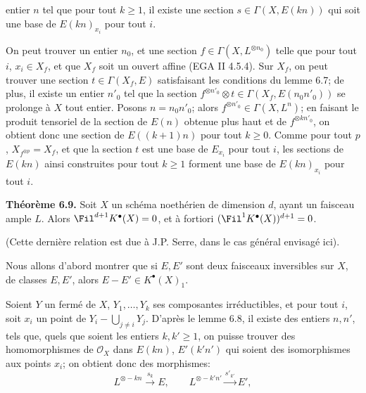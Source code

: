 entier $n$ tel que pour tout $k\ge1$, il existe une section $s\in\Gamma(X,E(kn))$ qui soit une base de $E(kn)_{x_i}$ pour tout $i$.

On peut trouver un entier $n_0$, et une section $f\in\Gamma(X,L^{\otimes n_0})$ telle que pour tout $i$, $x_i\in X_f$, et que $X_f$ soit un ouvert affine (EGA II 4.5.4). Sur $X_f$, on peut trouver une section $t\in\Gamma(X_f,E)$ satisfaisant les conditions du lemme 6.7; de plus, il existe un entier $n'_0$ tel que la section $f^{\otimes n'_0}\otimes t\in\Gamma(X_f,E(n_0n'_0))$ se prolonge à $X$ tout entier. Posons $n=n_0n'_0$; alors $f^{\otimes n'_0}\in\Gamma(X,L^n)$; en faisant le produit tensoriel de la section de $E(n)$ obtenue plus haut et de $f^{\otimes kn'_0}$, on obtient donc une section de $E((k+1)n)$ pour tout $k\ge0$. Comme pour tout $p$, $X_{f^{\otimes p}}=X_f$, et que la section $t$ est une base de $E_{x_i}$ pour tout $i$, les sections de $E(kn)$ ainsi construites pour tout $k\ge1$ forment une base de $E(kn)_{x_i}$ pour tout $i$.

\textbf{Théorème 6.9.} Soit $X$ un schéma noethérien de dimension $d$, ayant un faisceau ample $L$. Alors $\Fil^{d+1}K^{\bullet}(X)=0$, et à fortiori $(\Fil^1K^{\bullet}(X))^{d+1}=0$.

(Cette dernière relation est due à J.P. Serre, dans le cas général envisagé ici).

Nous allons d'abord montrer que si $E,E'$ sont deux faisceaux inversibles sur $X$, de classes $E,E'$, alors $E-E'\in K^{\bullet}(X)_1$.

Soient $Y$ un fermé de $X$, $Y_1,\ldots,Y_k$ ses composantes irréductibles, et pour tout $i$, soit $x_i$ un point de $Y_i-\bigcup_{j\ne i}Y_j$. D'après le lemme 6.8, il existe des entiers $n,n'$, tels que, quels que soient les entiers $k,k'\ge1$, on puisse trouver des homomorphismes de $\mathcal O_X$ dans $E(kn)$, $E'(k'n')$ qui soient des isomorphismes aux points $x_i$; on obtient donc des morphismes:
\[
  L^{\otimes -kn}\xrightarrow{s_k} E,
  \qquad
  L^{\otimes -k'n'}\xrightarrow{s'_{k'}} E',
\]
